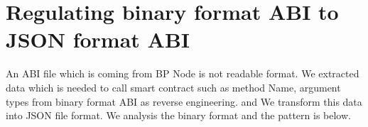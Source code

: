 \section{Regulating binary format ABI to JSON format ABI}
An ABI file which is coming from BP Node is not readable format. 
We extracted data which is needed to call smart contract such as method Name, argument types from binary format ABI as reverse engineering. and We transform this data into JSON file format. 
We analysis the binary format and the pattern is below.


